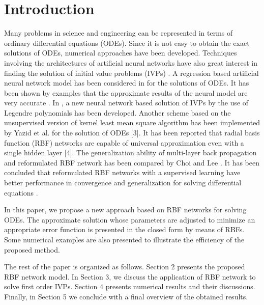 \documentclass{mc}
\begin{document}

\maketitle

\section{Introduction}


Many problems in science and engineering can be represented in terms of ordinary differential equations (ODEs). Since it is not easy to obtain the exact solutions of ODEs, numerical approaches have been developed. Techniques involving the architectures of artificial neural networks have also great interest in finding the solution of initial value problems (IVPs) \cite{Mal1, Mal2, Shir3, Park4}. A regression based artificial neural network model has been considered in \cite{Mal1} for the solutions of ODEs. It has been shown by examples that the approximate results of the neural model are very accurate \cite{Mal1}. In \cite{Mal2}, a new neural network based solution of IVPs by the use of Legendre polynomials has been developed. Another scheme based on the unsupervised version of kernel least mean square algorithm has been implemented by Yazid et al. for the solution of ODEs [3]. It has been reported that radial basis function (RBF) networks are capable of universal approximation even with a single hidden layer [4]. The generalization ability of multi-layer back propagation and reformulated RBF network has been compared by Choi and Lee \cite{Choi5}. It has been concluded that reformulated RBF networks with a supervised learning have better performance in convergence and generalization for solving differential equations \cite{Choi5}.

In this paper, we propose a new approach based on RBF networks for solving ODEs. The approximate solution whose parameters are adjusted to minimize an appropriate error function is presented in the closed form by means of RBFs. Some numerical examples are also presented to illustrate the efficiency of the proposed method.

The rest of the paper is organized as follows. Section 2 presents the proposed RBF network model. In Section 3, we discuss the application of RBF network to solve first order IVPs. Section 4 presents numerical results and their discussions. Finally, in Section 5 we conclude with a final overview of the obtained results.
\end{document}
